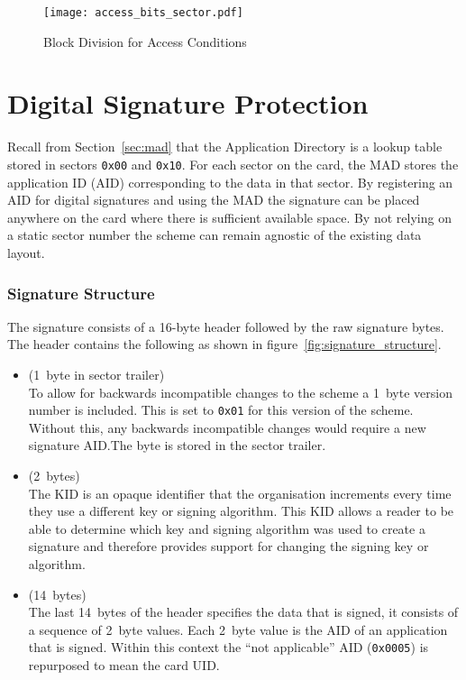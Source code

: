 \documentclass[dissertation.tex]{subfiles}
\begin{document}
  \begin{figure}[h]
    \centering
    \texttt{[image: access\_bits\_sector.pdf]}
    \caption{Block Division for Access Conditions}\label{fig:access_bits_sector}
  \end{figure}


  \section{Digital Signature Protection}
  Recall from Section~\vref{sec:mad} that the \mifare{} Application Directory is a lookup table stored in sectors \texttt{0x00} and \texttt{0x10}. For each sector on the card, the MAD stores the application ID (AID) corresponding to the data in that sector. By registering an AID for digital signatures and using the MAD the signature can be placed anywhere on the card where there is sufficient available space. By not relying on a static sector number the scheme can remain agnostic of the existing data layout.

  \subsubsection{Signature Structure}

  The signature consists of a 16-byte header followed by the raw signature bytes. The header contains the following as shown in figure~\vref{fig:signature_structure}.

  \begin{itemize}
    \item {} (\SI{1}{byte} in sector trailer) \\
      To allow for backwards incompatible changes to the scheme a \SI{1}{byte} version number is included. This is set to \texttt{0x01} for this version of the scheme. Without this, any backwards incompatible changes would require a new signature AID.\@ The byte is stored in the sector trailer.

    \item {} (\SI{2}{bytes}) \\
     The KID is an opaque identifier that the organisation increments every time they use a different key or signing algorithm. This KID allows a reader to be able to determine which key and signing algorithm was used to create a signature and therefore provides support for changing the signing key or algorithm.


    \item {} (\SI{14}{bytes}) \\
      The last \SI{14}{bytes} of the header specifies the data that is signed, it consists of a sequence of \SI{2}{byte} values. Each \SI{2}{byte} value is the AID of an application that is signed. Within this context the ``not applicable'' AID (\texttt{0x0005}) is repurposed to mean the card UID.\@
  \end{itemize}
\end{document}
